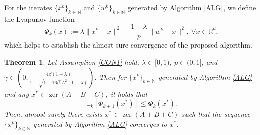 \documentclass[a4paper,12pt]{article}
\newtheorem{theorem}{Theorem}[section]
\theoremstyle{definition}
\DeclareMathOperator*{\zer}{zer}
\begin{document}
For the iterates $\{x^k\}_{k \in \mathbb{N}}$ and $\{w^k\}_{k \in \mathbb{N}}$ generated by Algorithm \ref{ALG}, we define the Lyapunov function
\begin{equation*}
\Phi_{k}(x):=\lambda \|x^k-x\|^2+\frac{1-\lambda}{p}\|w^k-x\|^2,\ \forall x \in \mathbb{R}^d,
\end{equation*}
 which helps to establish the almost sure convergence of the proposed algorithm.
\begin{theorem}
\label{the1}
{
\noindent
Let Assumption \ref{CON1} hold, $\lambda \in [0,1)$, $p \in (0,1]$, and $\gamma \in (0,\frac{4\beta(1-\lambda)}{1+\sqrt{1+16\beta^2L^2(1-\lambda)}})$. Then for $\{x^k\}_{k \in \mathbb{N}}$ generated by Algorithm \ref{ALG} and any $x^* \in \zer(A+B+C)$, it holds that
\begin{equation}
\label{lypunov}
\mathbb{E}_k[\Phi_{k+1}(x^*)] \leq \Phi_{k}(x^*).
\end{equation}
Then, almost surely there exists $x^* \in \zer(A+B+C)$ such that the sequence $\{x^k\}_{k \in \mathbb{N}}$  generated by Algorithm \ref{ALG} converges to $x^* $.
}
\end{theorem}
\end{document}
